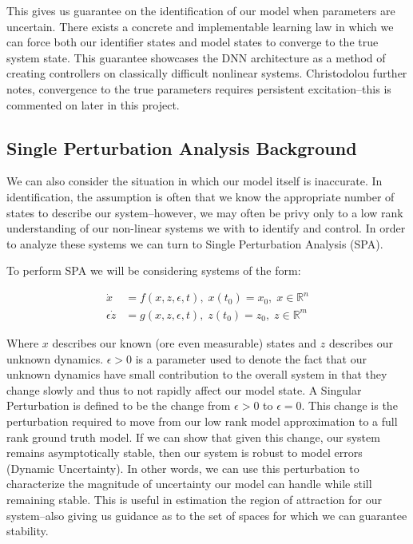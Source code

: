 \documentclass[12pt, letterpaper]{article}
\begin{document}
	This gives us guarantee on the identification of our model when parameters are uncertain. There exists a concrete and implementable learning law in which we can force both our identifier states and model states to converge to the true system state. This guarantee showcases the DNN architecture as a method of creating controllers on classically difficult nonlinear systems. Christodolou further notes, convergence to the true parameters requires persistent excitation--this is commented on later in this project. 
	
	\subsection{Single Perturbation Analysis Background}
	We can also consider the situation in which our model itself is inaccurate. In identification, the assumption is often that we know the appropriate number of states to describe our system--however, we may often be privy only to a low rank understanding of our non-linear systems we with to identify and control. In order to analyze these systems we can turn to Single Perturbation Analysis (SPA)\cite{Koko}. 
	
	To perform SPA we will be considering systems of the form\cite{Koko}:
	
	\begin{align*}
	\dot{x} &= f(x,z,\epsilon,t), \; x(t_{0}) = x_{0}, \; x \in \mathbb{R}^{n} \\
	\epsilon\dot{z} &= g(x,z,\epsilon,t), \; z(t_{0}) = z_{0}, \; z \in \mathbb{R}^{m}
	\end{align*}
	
	Where $x$ describes our known (ore even measurable) states and $z$ describes our unknown dynamics. $\epsilon > 0$ is a parameter used to denote the fact that our unknown dynamics have small contribution to the overall system in that they change slowly and thus to not rapidly affect our model state. A Singular Perturbation is defined to be the change from $\epsilon >0$ to $\epsilon = 0$. This change is the perturbation required to move from our low rank model approximation to a full rank ground truth model. If we can show that given this change, our system remains asymptotically stable, then our system is robust to model errors (Dynamic Uncertainty). In other words, we can use this perturbation to characterize the magnitude of uncertainty our model can handle while still remaining stable. This is useful in estimation the region of attraction for our system--also giving us guidance as to the set of spaces for which we can guarantee stability.
\end{document}
